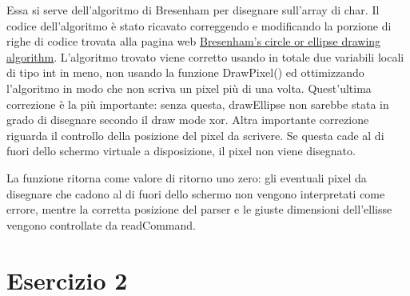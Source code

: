 \documentclass{article}
\begin{document}
		Essa si serve dell'algoritmo di Bresenham per disegnare sull'array di char.
                Il codice dell'algoritmo è stato ricavato correggendo e modificando la porzione di righe di codice trovata alla pagina web
                \href{https://sites.google.com/site/ruslancray/lab/projects/bresenhamscircleellipsedrawingalgorithm/bresenham-s-circle-ellipse-drawing-algorithm}{Bresenham's circle or ellipse drawing algorithm}.
                L'algoritmo trovato viene corretto usando in totale due variabili locali di tipo int in meno, non usando la funzione DrawPixel()
                ed ottimizzando l'algoritmo in modo che non scriva un pixel più di una volta. Quest'ultima correzione è la più importante:
                senza questa, drawEllipse non sarebbe stata in grado di disegnare secondo il draw mode xor.
                Altra importante correzione riguarda il controllo della posizione del pixel da scrivere.
                Se questa cade al di fuori dello schermo virtuale a disposizione, il pixel non viene disegnato.
		
		La funzione ritorna come valore di ritorno uno zero: gli eventuali pixel da disegnare che cadono al di fuori dello schermo non vengono interpretati come errore, mentre la corretta posizione del parser e
                le giuste dimensioni dell'ellisse vengono controllate da readCommand.

\section{Esercizio 2}
\end{document}

